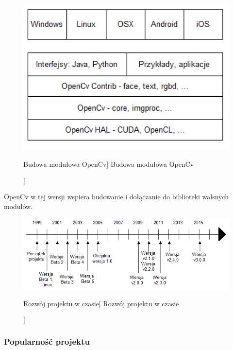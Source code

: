 \documentclass[a4paper,12pt]{article}
\begin{document}
				\begin{figure}[!ht]  
					\begin{center}
						\includegraphics[width=12cm] {image//openCvBudowa.png} 
					\end{center}
					\caption
					    [Budowa modułowa OpenCv]
					    {Budowa modułowa OpenCv}
				\end{figure}

				\par OpenCv w tej wersji wspiera budowanie i dołączanie do biblioteki walsnych modulów.
	            
				\begin{figure}[!ht]   
					\begin{center}
		    				\includegraphics[width=\linewidth] {image//osCzasu.png} 
					\end{center}
					\caption
					    [Rozwój projektu w czasie]  
					    {Rozwój projektu w czasie}  
				\end{figure}


		\subsubsection{Popularność projektu}  
\end{document}

